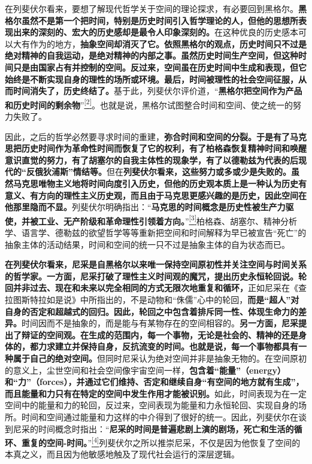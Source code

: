 \documentclass[UTF8, fontset = sourcesans, a4paper, oneside, zihao =
-4, scheme=chinese, no-math, space=true]{ctexbook}
\begin{document}
在列斐伏尔看来，要想了解现代哲学关于空间的理论探求，有必要回到黑格尔。\textbf{黑格尔虽然不是第一个把时间，特别是历史时间引入哲学理论的人，但他的思想所表现出来的深刻的、宏大的历史感却是最令人印象深刻的。}在这种优良的历史感本可以大有作为的地方，\textbf{抽象空间却消灭了它。依照黑格尔的观点，历史时间只不过是绝对精神的自我运动，是绝对精神的内部之事。虽然历史时间生产空间，但这种时间只是由国家占有并控制的空间。反过来，空间虽在历史时间中生成和表现，但它始终是不断实现自身的理性的场所或环境。最后，时间被理性的社会空间征服，从而时间消失了，历史终结了。}基于此，列斐伏尔评价道，``\textbf{黑格尔把空间作为产品和历史时间的剩余物}''\protect\hypertarget{part0006_split_001.htmlux5cux23w2}{}{}\protect\hyperlink{part0006_split_003.htmlux5cux23m2}{\textsuperscript{{[}2{]}}}。也就是说，黑格尔试图整合时间和空间、使之统一的努力失败了。

因此，之后的哲学必然要寻求时间的重建，\textbf{弥合时间和空间的分裂。于是有了马克思把历史时间作为革命性时间而恢复了它的权利，有了柏格森恢复精神时间和唤醒意识直觉的努力，有了胡塞尔的自我主体性的现象学，有了以德勒兹为代表的后现代的``反俄狄浦斯''情结等。}但在\textbf{列斐伏尔看来，这些努力或多或少是失败的。虽然马克思唯物主义地将时间向度引入历史，但他的历史观本质上是一种认为历史有意义、有方向的理性主义历史观，而且由于马克思更感兴趣的是历史，因此空间在他那里隐而不显。}列斐伏尔明确指出：``\textbf{马克思的时间概念是历史性被生产力驱使，并被工业、无产阶级和革命理性引领着方向。}''\protect\hypertarget{part0006_split_001.htmlux5cux23w3}{}{}\protect\hyperlink{part0006_split_003.htmlux5cux23m3}{\textsuperscript{{[}3{]}}}柏格森、胡塞尔、精神分析学、语言学、德勒兹的欲望哲学等等重新把空间和时间解释为早已被宣告``死亡''的抽象主体的活动结果，时间和空间的统一只不过是抽象主体的自为状态而已。

\textbf{在列斐伏尔看来，尼采是自黑格尔以来唯一保持空间原初性并关注空间与时间关系的哲学家。一方面，尼采打破了理性主义时间观的魔咒，提出历史永恒轮回说。轮回并非过去、现在和未来以完全相同的方式无限次地重复和循环，}正如尼采在《查拉图斯特拉如是说》中所指出的，不是动物和``侏儒''心中的轮回，\textbf{而是``超人''对自身的否定和超越式的回归。因此，轮回之中包含着排斥同一性、体现生命力的差异。}时间因而不是抽象的，而是能与有某物存在的空间相容的。\textbf{另一方面，尼采提出了辩证的空间观。在生成的范围内，每一个事物，无论是社会的、精神的还是身体的，都力求建立并保持自身，反抗流变的时间。也就是说，每一个事物都具有一种属于自己的绝对空间。}但同时尼采认为绝对空间并非是抽象无物的。在空间原初的意义上，尘世空间和社会空间像宇宙空间一样，\textbf{包含着``能量''（energy）和``力''（forces），并通过它们维持、否定和继续自身``有空间的地方就有生成''，而且能量和力只有在特定的空间中发生作用才能被识别。}如此，时间表现为在一定空间中的能量和力的轮回，反过来，空间表现为能量和力永恒轮回、实现自身的场所。时间和空间通过能量和力这样的中介得到了很好的统一。因此，列斐伏尔在谈到尼采的时间概念时指出：``\textbf{尼采的时间是普遍悲剧上演的剧场，死亡和生活的循环、重复的空间-时间。}''\protect\hypertarget{part0006_split_001.htmlux5cux23w4}{}{}\protect\hyperlink{part0006_split_003.htmlux5cux23m4}{\textsuperscript{{[}4{]}}}列斐伏尔之所以推崇尼采，不仅是因为他恢复了空间的本真之义，而且因为他敏感地触及了现代社会运行的深层逻辑。
\end{document}
